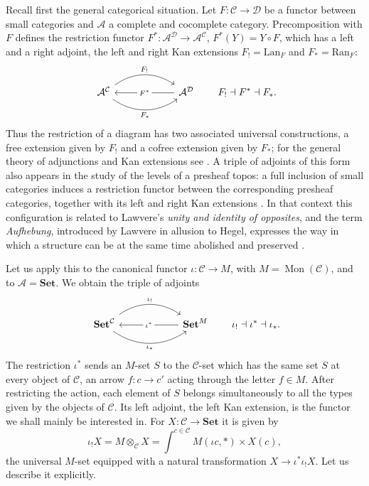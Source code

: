 \documentclass[11pt]{amsart}
\theoremstyle{definition}
\theoremstyle{remark}
\numberwithin{figure}{section}%
\newcommand{\CC}{\mathcal{C}}
\newcommand{\DD}{\mathcal{D}}
\DeclareMathOperator{\Mon}{Mon}
\newcommand{\Ran}{\mathrm{Ran}}
\newcommand{\Lan}{\mathrm{Lan}}
\newcommand{\Set}{\mathbf{Set}}
\newcommand{\A}{\mathcal{A}}
\begin{document}
Recall first the general categorical situation. Let $F\colon\CC\to\DD$ be a functor between small categories and $\A$ a complete and cocomplete category. Precomposition with $F$ defines the restriction functor $F^*\colon\A^{\DD}\to\A^{\CC}$, $F^*(Y)=Y\circ F$, which has a left and a right adjoint, the left and right Kan extensions $F_!=\Lan_F$ and $F_*=\Ran_F$:
\[
\begin{tikzcd}[column sep=6em]
\A^{\CC}
\ar[r, bend left=35, "F_!"]
\ar[r, bend right=35, swap, "F_*"]
&
\A^{\DD}
\ar[l, "F^*" description]
\end{tikzcd}
\qquad
F_!\dashv F^*\dashv F_*.
\]
Thus the restriction of a diagram has two associated universal constructions, a free extension given by $F_!$ and a cofree extension given by $F_*$; for the general theory of adjunctions and Kan extensions see \cite[Chapters~4 and~6]{RiehlCategoryTheoryContext}. A triple of adjoints of this form also appears in the study of the levels of a presheaf topos: a full inclusion of small categories induces a restriction functor between the corresponding presheaf categories, together with its left and right Kan extensions \cite[Section~1]{KennettRiehlRoyZaks2011}. In that context this configuration is related to Lawvere's \emph{unity and identity of opposites}, and the term \emph{Aufhebung}, introduced by Lawvere in allusion to Hegel, expresses the way in which a structure can be at the same time abolished and preserved \cite{LawvereFutureCategoryTheory}.

Let us apply this to the canonical functor $\iota\colon\CC\to M$, with $M=\Mon(\CC)$, and to $\A=\Set$. We obtain the triple of adjoints
\[
\begin{tikzcd}[column sep=6em]
\Set^{\CC}
\ar[r, bend left=35, "\iota_!"]
\ar[r, bend right=35, swap, "\iota_*"]
&
\Set^M
\ar[l, "\iota^*" description]
\end{tikzcd}
\qquad
\iota_!\dashv\iota^*\dashv\iota_*.
\]
The restriction $\iota^*$ sends an $M$-set $S$ to the $\CC$-set which has the same set $S$ at every object of $\CC$, an arrow $f\colon c\to c'$ acting through the letter $f\in M$. After restricting the action, each element of $S$ belongs simultaneously to all the types given by the objects of $\CC$. Its left adjoint, the left Kan extension, is the functor we shall mainly be interested in. For $X\colon\CC\to\Set$ it is given by
\[
\iota_!X=M\otimes_{\CC}X=\int^{c\in\CC}M(\iota c,*)\times X(c),
\]
the universal $M$-set equipped with a natural transformation $X\to\iota^*\iota_!X$. Let us describe it explicitly.
\end{document}
